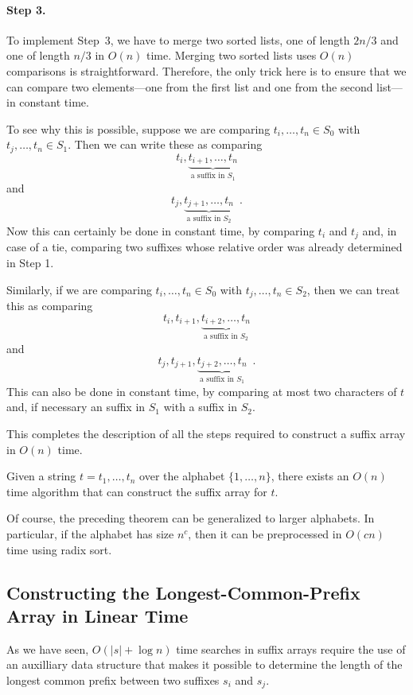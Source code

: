 \paragraph{Step 3.}
To implement Step~3, we have to merge two sorted lists, one of length $2n/3$ and one of length $n/3$ in $O(n)$ time.  Merging two sorted lists uses $O(n)$ comparisons is straightforward. Therefore, the only trick here is to ensure that we can compare two elements---one from the first list and one from the second list---in constant time.  

To see why this is possible, suppose we are comparing $t_i,\ldots,t_n\in S_0$ with $t_j,\ldots,t_n\in S_1$.  Then we can write these as comparing
\[
   t_i,\underbrace{t_{i+1},\ldots,t_n}_{\text{a suffix in $S_1$}}
\]
and 
\[
   t_j,\underbrace{t_{j+1},\ldots,t_n}_{\text{a suffix in $S_2$}}
    \enspace .
\]
Now this can certainly be done in constant time, by comparing $t_i$ and $t_j$ and, in case of a tie, comparing two suffixes whose relative order was already determined in Step 1.

Similarly, if we are comparing 
$t_i,\ldots,t_n\in S_0$ with $t_j,\ldots,t_n\in S_2$, then we can treat this as comparing
\[
   t_i,t_{i+1},\underbrace{t_{i+2},\ldots,t_n}_{\text{a suffix in $S_2$}}
\]
and 
\[
   t_j,t_{j+1},\underbrace{t_{j+2},\ldots,t_n}_{\text{a suffix in $S_1$}}
    \enspace .
\]
This can also be done in constant time, by comparing at most two
characters of $t$ and, if necessary an suffix in $S_1$ with a suffix
in $S_2$.

This completes the description of all the steps required to construct a suffix array in $O(n)$ time.

\begin{thm}
  Given a string $t=t_1,\ldots,t_n$ over the alphabet $\{1,\ldots,n\}$,
  there exists an $O(n)$ time algorithm that can construct the suffix
  array for $t$.
\end{thm}


Of course, the preceding theorem can be generalized to larger alphabets. In particular, if the alphabet has size $n^c$, then it can be preprocessed in $O(cn)$ time using radix sort.

\subsection{Constructing the Longest-Common-Prefix Array in Linear Time}

As we have seen, $O(|s|+\log n)$ time searches in suffix arrays require the use of an auxilliary data structure that makes it possible to determine the length of the longest common prefix between two suffixes $s_i$ and $s_j$.

